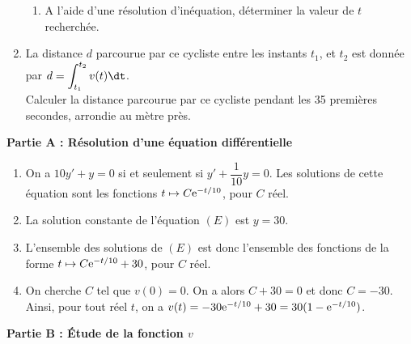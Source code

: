 \documentclass[11pt,fleqn, openany]{book} %
\begin{document}
\begin{exercise}
\begin{enumerate}
\begin{enumerate}


\item A l'aide d'une résolution d'inéquation, déterminer la valeur de $t$ recherchée.
\end{enumerate}
   
    \item La distance $d$ parcourue par ce cycliste entre les instants $t_1$, et $t_2$ est donnée par $d=\displaystyle\int_{t_1}^{t_2}v(t)\dt$.\\
    Calculer la distance parcourue par ce cycliste pendant les 35 premières secondes, arrondie au mètre près.
\end{enumerate}

\end{exercise}

\begin{solution}

\textbf{Partie A : Résolution d'une équation différentielle}
\begin{enumerate}
\item On a $10y'+y=0$ si et seulement si $y'+\dfrac{1}{10}y=0$. Les solutions de cette équation sont les fonctions $t\mapsto C\mathrm{e}^{-t/10}$, pour $C$ réel.
\item La solution constante de l'équation $(E)$ est $y=30$.
\item L'ensemble des solutions de $(E)$ est donc l'ensemble des fonctions de la forme $t\mapsto C\mathrm{e}^{-t/10}+30$, pour $C$ réel.
\item On cherche $C$ tel que $v(0)=0$. On a alors $C+30=0$ et donc $C=-30$. Ainsi, pour tout réel $t$, on a $v(t)=-30\mathrm{e}^{-t/10}+30=30(1-\mathrm{e}^{-t/10})$.
\end{enumerate}

\textbf{Partie B : Étude de la fonction $v$}



\end{solution}
\end{document}
